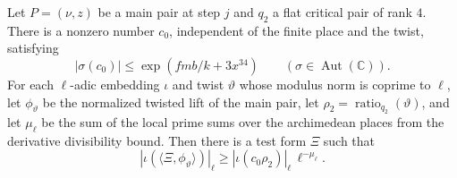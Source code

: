 \begin{lemma}
\label{lem:c-test-pairing-lower}
\emitthmsource
Let $P=(\nu,z)$ be a main pair at step $j$ and $q_2$ a flat critical pair of rank $4$. There is a nonzero number $c_0$, independent of the finite place and the twist, satisfying
\[
 |\sigma(c_0)|\le \exp(fmb/k+3x^{34}) \qquad(\sigma\in\operatorname{Aut}(\mathbb C)).
\]
For each $\ell$-adic embedding $\iota$ and twist $\vartheta$ whose modulus norm is coprime to $\ell$, let $\phi_\vartheta$ be the normalized twisted lift of the main pair, let $\rho_2=\operatorname{ratio}_{q_2}(\vartheta)$, and let $\mu_\ell$ be the sum of the local prime sums over the archimedean places from the derivative divisibility bound. Then there is a test form $\Xi$ such that
\[
 |\iota(\langle\Xi,\phi_\vartheta\rangle)|_\ell
 \ge |\iota(c_0\rho_2)|_\ell\,\ell^{-\mu_\ell}.
\]
\end{lemma}
